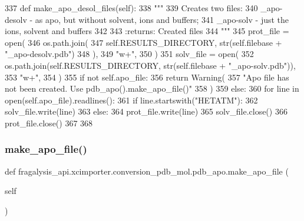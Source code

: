 \begin{DoxyCode}
337     \textcolor{keyword}{def }make\_apo\_desol\_files(self):
338         \textcolor{stringliteral}{"""}
339 \textcolor{stringliteral}{        Creates two files:}
340 \textcolor{stringliteral}{        \_apo-desolv - as apo, but without solvent, ions and buffers;}
341 \textcolor{stringliteral}{        \_apo-solv - just the ions, solvent and buffers}
342 \textcolor{stringliteral}{}
343 \textcolor{stringliteral}{        :returns: Created files}
344 \textcolor{stringliteral}{        """}
345         prot\_file = open(
346             os.path.join(
347                 self.RESULTS\_DIRECTORY, str(self.filebase + \textcolor{stringliteral}{"\_apo-desolv.pdb"})
348             ),
349             \textcolor{stringliteral}{"w+"},
350         )
351         solv\_file = open(
352             os.path.join(self.RESULTS\_DIRECTORY, str(self.filebase + \textcolor{stringliteral}{"\_apo-solv.pdb"})),
353             \textcolor{stringliteral}{"w+"},
354         )
355         \textcolor{keywordflow}{if} \textcolor{keywordflow}{not} self.apo\_file:
356             \textcolor{keywordflow}{return} Warning(
357                 \textcolor{stringliteral}{"Apo file has not been created. Use pdb\_apo().make\_apo\_file()"}
358             )
359         \textcolor{keywordflow}{else}:
360             \textcolor{keywordflow}{for} line \textcolor{keywordflow}{in} open(self.apo\_file).readlines():
361                 \textcolor{keywordflow}{if} line.startswith(\textcolor{stringliteral}{"HETATM"}):
362                     solv\_file.write(line)
363                 \textcolor{keywordflow}{else}:
364                     prot\_file.write(line)
365         solv\_file.close()
366         prot\_file.close()
367 
368 
\end{DoxyCode}
\mbox{\label{classfragalysis__api_1_1xcimporter_1_1conversion__pdb__mol_1_1pdb__apo_a08488b34eeb131d43d3139ecbbdb78fb}} 
\subsubsection{\texorpdfstring{make\+\_\+apo\+\_\+file()}{make\_apo\_file()}}
{\footnotesize\ttfamily def fragalysis\+\_\+api.\+xcimporter.\+conversion\+\_\+pdb\+\_\+mol.\+pdb\+\_\+apo.\+make\+\_\+apo\+\_\+file (\begin{DoxyParamCaption}\item[{}]{self }\end{DoxyParamCaption})}

